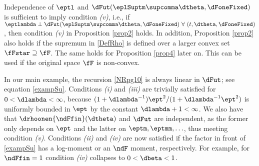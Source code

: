 \begin{rem} \rm
\label{remprop2}
Independence of $\eptl$ and $\dFut(\eplSuptm\supcomma\dtheta,\dFoneFixed)$ is sufficient to imply condition \textit{(v)}, i.e.,
if
$\eptlambda \perp \dFut(\eplSuptm\supcomma\dtheta,\dFoneFixed) \ \forall \ (t,\dtheta,\dFoneFixed)$,
then condition \textit{(v)} in Proposition \ref{prop2} holds.
In addition, Proposition \ref{prop2} also holds if the supremum in \eqref{DefRho} is defined over a larger convex set $\fFstar \supseteq \fF$. The same holds for Proposition \ref{prop4} later on. This can be used if the original space $\fF$ is non-convex.
\end{rem}


\begin{exmc} %
In our main example, the recursion \eqref{NRpg10} is always linear in $\dFut$; see equation \eqref{exampSu}. 
Conditions \textit{(i)} and \textit{(iii)} are trivially satisfied for $0<\dlambda<\infty$, because $(1+\dlambda^{-1})\ept^2/(1+\dlambda^{-1}\ept^2)$ is uniformly bounded in $\ept$ by the constant $\dlambda+1 < \infty$. 
We also have that $\drhoonen{\ndFfin}(\dtheta)$ and $\dFut$ are independent, as the former only depends on $\ept$ and the latter on $\eptm, \eptmm, \ldots$, thus meeting condition \textit{(v)}. 
Conditions \textit{(ii)} and \textit{(iv)} are now satisfied if the factor in front of \eqref{exampSu} has a log-moment or an $\ndF$ moment, respectively. For example, for $\ndFfin=1$ condition \textit{(iv)} collapses to $0<\dbeta<1$.
\end{exmc}


